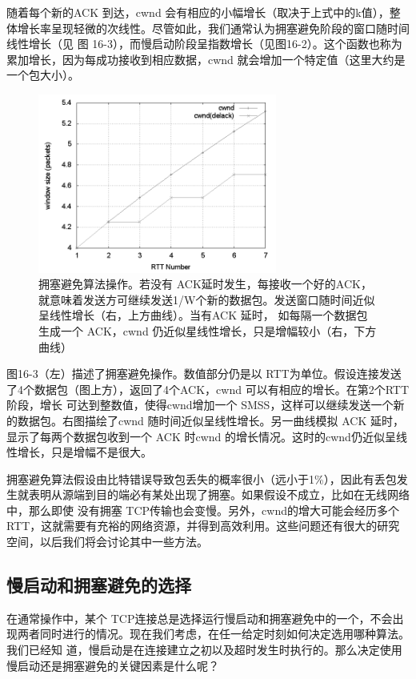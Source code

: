 随着每个新的ACK 到达，cwnd 会有相应的小幅增长（取决于上式中的k值），整体增长率呈现轻微的次线性。尽管如此，我们通常认为拥塞避免阶段的窗口随时间线性增长（见
图 16-3），而慢启动阶段呈指数增长（见图16-2）。这个函数也称为累加增长，因为每成功接收到相应数据，cwnd 就会增加一个特定值（这里大约是一个包大小）。

\begin{figure}[!htb]
    \centering
	\includegraphics[width=0.7\textwidth]{imgs/16/16-3.png}
	\caption{拥塞避免算法操作。若没有 ACK延时发生，每接收一个好的ACK，就意味着发送方可继续发送1/W个新的数据包。发送窗口随时间近似呈线性增长（右，上方曲线）。当有ACK 延时，
    如每隔一个数据包生成一个 ACK，cwnd 仍近似星线性增长，只是增幅较小（右，下方曲线）}
\end{figure}

图16-3（左）描述了拥塞避免操作。数值部分仍是以 RTT为单位。假设连接发送了4个数据包（图上方），返回了4个ACK，cwnd 可以有相应的增长。在第2个RTT阶段，增长
可达到整数值，使得cwnd增加一个 SMSS，这样可以继续发送一个新的数据包。右图描绘了cwnd 随时间近似呈线性增长。另一曲线模拟 ACK 延时，显示了每两个数据包收到一个
ACK 时cwnd 的增长情况。这时的cwnd仍近似呈线性增长，只是增幅不是很大。

拥塞避免算法假设由比特错误导致包丢失的概率很小（远小于1\%），因此有丢包发生就表明从源端到目的端必有某处出现了拥塞。如果假设不成立，比如在无线网络中，那么即使
没有拥塞 TCP传输也会变慢。另外，cwnd的增大可能会经历多个 RTT，这就需要有充裕的网络资源，并得到高效利用。这些问题还有很大的研究空间，以后我们将会讨论其中一些方法。

\subsection{慢启动和拥塞避免的选择}
在通常操作中，某个 TCP连接总是选择运行慢启动和拥塞避免中的一个，不会出现两者同时进行的情况。现在我们考虑，在任一给定时刻如何决定选用哪种算法。我们已经知
道，慢启动是在连接建立之初以及超时发生时执行的。那么决定使用慢启动还是拥塞避免的关键因素是什么呢？

